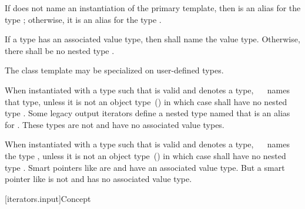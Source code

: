 \begin{addedblock}
\pnum
If  does not name an instantiation of the primary
template, then  is an
alias for the type ; otherwise, it is an
alias for the type .
\end{addedblock}

\pnum
If a type  has an associated value type, then
shall name the value type. Otherwise, there shall be no nested type
.

\pnum
The  class template may be
specialized on user-defined types.

\pnum
When instantiated with a type 
such that  is valid and denotes a type,
\ \ 
names that type, unless it is not an object type~() in which case
shall have no nested type . \enternote Some legacy output
iterators define a nested type named  that is an alias for . These
types are not  and have no associated value types.\exitnote

\pnum
When instantiated with a type 
such that  is valid and denotes a type,
\ \ 
names the type , unless it is
not an object type~() in which case
 shall have no nested
type . \enternote Smart pointers like
 are  and have an associated value type.
But a smart pointer like  is not  and
has no associated value type.\exitnote




\setcounter{subsubsection}{10}
[iterators.input]{Concept }

